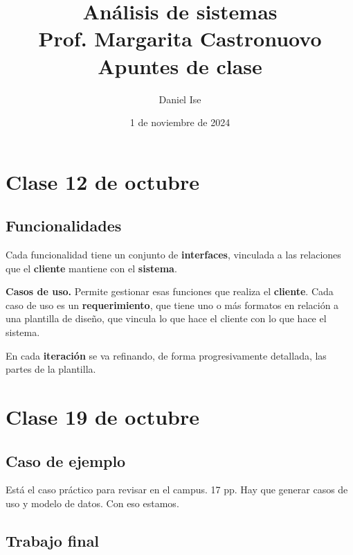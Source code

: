 \documentclass[12pt]{article}
\title{Análisis de sistemas\\Prof. Margarita Castronuovo\\Apuntes de clase}
\author{Daniel Ise}
\date{1 de noviembre de 2024}
\begin{document}
\maketitle

\tableofcontents

\section{Clase 12 de octubre}

\subsection{Funcionalidades}

Cada funcionalidad tiene un conjunto de \textbf{interfaces},
vinculada a las relaciones que el \textbf{cliente} mantiene con el \textbf{sistema}.

\textbf{Casos de uso.}
Permite gestionar esas funciones que realiza el \textbf{cliente}.
Cada caso de uso es un \textbf{requerimiento},
que tiene uno o más formatos en relación a una plantilla de diseño,
que vincula lo que hace el cliente con lo que hace el sistema.

En cada \textbf{iteración} se va refinando,
de forma progresivamente detallada,
las partes de la plantilla.

\section{Clase 19 de octubre}

\subsection{Caso de ejemplo}

Está el caso práctico para revisar en el campus.
17 pp.
Hay que generar casos de uso y modelo de datos.
Con eso estamos.

\subsection{Trabajo final}
\end{document}
